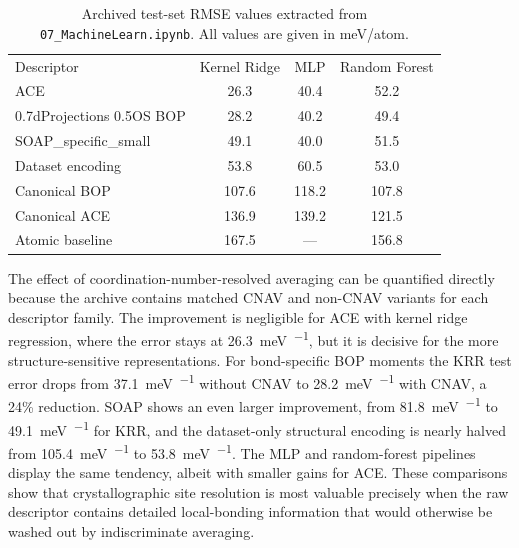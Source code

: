\begin{table}[t]
\caption{Archived test-set RMSE values extracted from \texttt{07\_MachineLearn.ipynb}. All values are given in meV/atom.}
\label{tab:rmse}
\begin{ruledtabular}
\begin{tabular}{lccc}
Descriptor & Kernel Ridge & MLP & Random Forest \\
\colrule
ACE & 26.3 & 40.4 & 52.2 \\
0.7dProjections 0.5OS BOP & 28.2 & 40.2 & 49.4 \\
SOAP\_specific\_small & 49.1 & 40.0 & 51.5 \\
Dataset encoding & 53.8 & 60.5 & 53.0 \\
Canonical BOP & 107.6 & 118.2 & 107.8 \\
Canonical ACE & 136.9 & 139.2 & 121.5 \\
Atomic baseline & 167.5 & --- & 156.8 \\
\end{tabular}
\end{ruledtabular}
\end{table}

The effect of coordination-number-resolved averaging can be quantified directly because the archive contains matched CNAV and non-CNAV variants for each descriptor family. The improvement is negligible for ACE with kernel ridge regression, where the error stays at \SI{26.3}{\milli\electronvolt\per\atom}, but it is decisive for the more structure-sensitive representations. For bond-specific BOP moments the KRR test error drops from \SI{37.1}{\milli\electronvolt\per\atom} without CNAV to \SI{28.2}{\milli\electronvolt\per\atom} with CNAV, a 24\% reduction. SOAP shows an even larger improvement, from \SI{81.8}{\milli\electronvolt\per\atom} to \SI{49.1}{\milli\electronvolt\per\atom} for KRR, and the dataset-only structural encoding is nearly halved from \SI{105.4}{\milli\electronvolt\per\atom} to \SI{53.8}{\milli\electronvolt\per\atom}. The MLP and random-forest pipelines display the same tendency, albeit with smaller gains for ACE. These comparisons show that crystallographic site resolution is most valuable precisely when the raw descriptor contains detailed local-bonding information that would otherwise be washed out by indiscriminate averaging.

